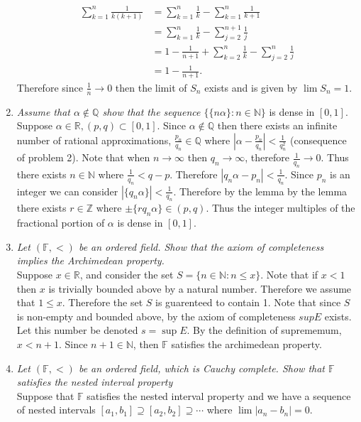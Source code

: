 \documentclass[12pt, letterpaper]{article}
\newcommand{\Z}{\mathbb{Z}}
\newcommand{\N}{\mathbb{N}}
\newcommand{\R}{\mathbb{R}}
\newcommand{\Q}{\mathbb{Q}}
\newcommand{\F}{\mathbb{F}}
\begin{document}
\begin{enumerate}
	\begin{align*}
		\sum_{k=1}^n \frac{1}{k(k+1)} &= \sum_{k=1}^n \frac{1}{k} - \sum_{k=1}^n \frac{1}{k+1}\\
		&= \sum_{k=1}^n \frac{1}{k} - \sum_{j=2}^{n+1} \frac{1}{j}\\
		&= 1 - \frac{1}{n+1} + \sum_{k=2}^n \frac{1}{k} - \sum_{j=2}^n \frac{1}{j}\\
		&= 1 - \frac{1}{n+1}.
	\end{align*}
	Therefore since $\frac{1}{n} \to 0$ then the limit of $S_n$ exists and is given by $\lim S_n = 1$.
	\item \textit{Assume that $\alpha \not \in \Q$ show that the sequence $\{\{n\alpha\}: n \in \N\}$} is dense in $[0,1]$. \\
	Suppose $\alpha \in \R, (p,q) \subset [0,1]$.  Since $\alpha \not \in \Q$ then there exists an infinite number of rational approximations, $\frac{p_n}{q_n} \in \Q$ where $|\alpha - \frac{p_n}{q_n}| < \frac{1}{q_n^2}$ 
	(consequence of problem 2).  Note that when $n \to \infty$ then $q_n \to \infty$, therefore $\frac{1}{q_n} \to 0$.  
	Thus there exists $n \in \N$ where $\frac{1}{q_n} < q - p$.  Therefore
	$|q_n\alpha - p_n| < \frac{1}{q_n}$.  Since $p_n$ is an integer we can consider $|\{q_n \alpha \}| < \frac{1}{q_n}$.  Therefore by the lemma by the lemma there exists $r \in \Z$ where $\pm\{rq_n\alpha\} \in (p,q)$.  Thus the integer multiples of the fractional portion of $\alpha$ is dense in $[0,1]$.
	\item \textit{Let $(\mathbb{F}, <)$ be an ordered field. Show that the axiom of completeness implies the Archimedean
property.}\\
	Suppose $x \in \R$, and consider the set $S = \{n \in \N: n \leq x\}$. Note that if $x < 1$ then $x$ is trivially bounded above by a natural number.  Therefore we assume that $1 \leq x$.  Therefore the set $S$ is guarenteed to contain 1.   
	Note that since $S$ is non-empty and bounded above, by the axiom of completeness $sup E$ exists.  Let this number be denoted 
	$s = \sup E$.  By the definition of suprememum, $x < n+1$.  Since $n+1 \in \N$, then $\mathbb{F}$ satisfies the archimedean property.
	\item \textit{Let $(\mathbb{F}, <)$ be an ordered field, which is Cauchy complete. Show that $\mathbb{F}$ satisfies the nested interval property}\\
	Suppose that $\F$ satisfies the nested interval property and we have a 
	sequence of nested intervals 
	$[a_1,b_1] \supseteq [a_2,b_2] \supseteq \cdots$ where $\lim |a_n-b_n| = 0$.  

\end{enumerate}
\end{document}
